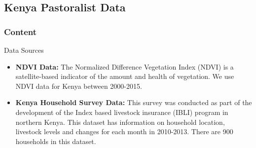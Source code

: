 \documentclass{beamer}
\begin{document}
    

    



\subsection{Kenya Pastoralist Data}
\begin{frame}
    \frametitle{Content}
\end{frame}

\begin{frame}{Data Sources}
\begin{itemize}
    \setlength\itemsep{2em}
    \item \textbf{NDVI Data:} The Normalized Difference Vegetation Index (NDVI) is a satellite-based indicator of the amount and health of vegetation. We use NDVI data for Kenya between 2000-2015. %
    \item \textbf{Kenya Household Survey Data:} This survey was conducted as part of the development of the Index based livestock insurance (IBLI) program in northern Kenya.  This dataset has information on household location, livestock levels and changes for each month in 2010-2013. There are 900 households in this dataset. 
\end{itemize}
\end{frame}
\end{document}
